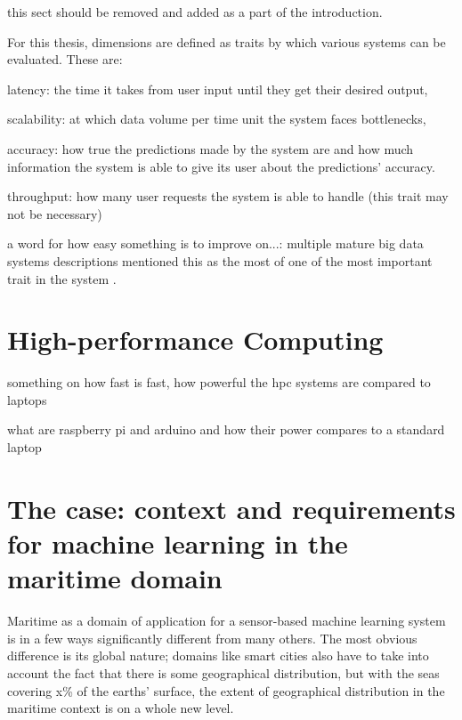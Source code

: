 
this sect should be removed and added as a part of the introduction.

For this thesis, dimensions are defined as traits by which various systems can be evaluated. These are:

latency: the time it takes from user input until they get their desired output,

scalability: at which data volume per time unit the system faces bottlenecks,

accuracy: how true the predictions made by the system are and how much information the system is able to give its user about the predictions' accuracy.

throughput: how many user requests the system is able to handle (this trait may not be necessary)

a word for how easy something is to improve on...: multiple mature big data systems descriptions mentioned this as the most of one of the most important trait in the system \cite{uber} \cite{facebook}.

\section{High-performance Computing}

something on how fast is fast, how powerful the hpc systems are compared to laptops

what are raspberry pi and arduino and how their power compares to a standard laptop

\section{The case: context and requirements for machine learning in the maritime domain}

Maritime as a domain of application for a sensor-based machine learning system is in a few ways significantly different from many others. The most obvious difference is its global nature; domains like smart cities also have to take into account the fact that there is some geographical distribution, but with the seas covering x\% of the earths' surface, the extent of geographical distribution in the maritime context is on a whole new level.

